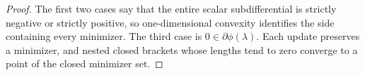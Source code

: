\documentclass[10pt]{article}
\begin{document}
\begin{proof}
The first two cases say that the entire scalar subdifferential is strictly
negative or strictly positive, so one-dimensional convexity identifies the
side containing every minimizer.  The third case is
\(0\in\partial\phi(\lambda)\).  Each update preserves a minimizer, and nested
closed brackets whose lengths tend to zero converge to a point of the closed
minimizer set.
\end{proof}





\ifdefined\SSOReview

\else

\fi

\end{document}
